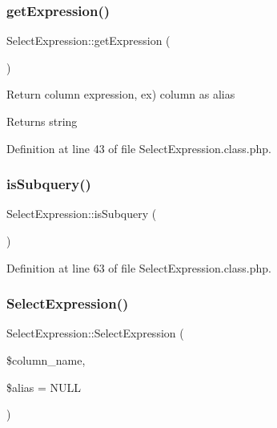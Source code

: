 \subsubsection{\texorpdfstring{get\+Expression()}{getExpression()}}
{\footnotesize\ttfamily Select\+Expression\+::get\+Expression (\begin{DoxyParamCaption}{ }\end{DoxyParamCaption})}

Return column expression, ex) column as alias \begin{DoxyReturn}{Returns}
string 
\end{DoxyReturn}


Definition at line 43 of file Select\+Expression.\+class.\+php.

\hypertarget{classSelectExpression_a9b827b574a24dbbaa54932a639d8d5aa}{}\label{classSelectExpression_a9b827b574a24dbbaa54932a639d8d5aa} 
\subsubsection{\texorpdfstring{is\+Subquery()}{isSubquery()}}
{\footnotesize\ttfamily Select\+Expression\+::is\+Subquery (\begin{DoxyParamCaption}{ }\end{DoxyParamCaption})}



Definition at line 63 of file Select\+Expression.\+class.\+php.

\hypertarget{classSelectExpression_abc497194c4a6ec6543f594d314f26143}{}\label{classSelectExpression_abc497194c4a6ec6543f594d314f26143} 
\subsubsection{\texorpdfstring{Select\+Expression()}{SelectExpression()}}
{\footnotesize\ttfamily Select\+Expression\+::\+Select\+Expression (\begin{DoxyParamCaption}\item[{}]{\$column\+\_\+name,  }\item[{}]{\$alias = {\ttfamily NULL} }\end{DoxyParamCaption})}

